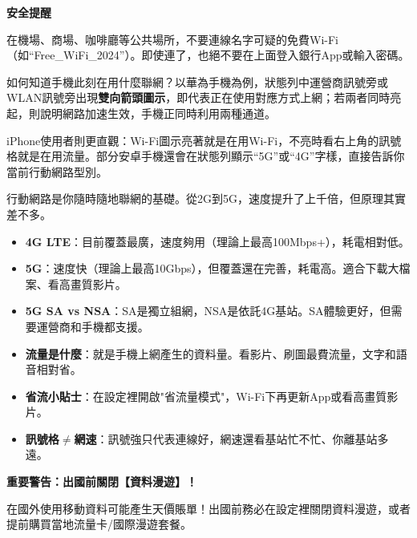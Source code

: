 \textbf{安全提醒}\par

在機場、商場、咖啡廳等公共場所，不要連線名字可疑的免費Wi-Fi（如“Free\_WiFi\_2024”）。即使連了，也絕不要在上面登入銀行App或輸入密碼。


如何知道手機此刻在用什麼聯網？以華為手機為例，狀態列中運營商訊號旁或WLAN訊號旁出現\textbf{雙向箭頭圖示}，即代表正在使用對應方式上網；若兩者同時亮起，則說明網路加速生效，手機正同時利用兩種通道。

iPhone使用者則更直觀：Wi-Fi圖示亮著就是在用Wi-Fi，不亮時看右上角的訊號格就是在用流量。部分安卓手機還會在狀態列顯示“5G”或“4G”字樣，直接告訴你當前行動網路型別。


行動網路是你隨時隨地聯網的基礎。從2G到5G，速度提升了上千倍，但原理其實差不多。


\begin{itemize}
  \item \textbf{4G LTE}：目前覆蓋最廣，速度夠用（理論上最高100Mbps+），耗電相對低。
  \item \textbf{5G}：速度快（理論上最高10Gbps），但覆蓋還在完善，耗電高。適合下載大檔案、看高畫質影片。
  \item \textbf{5G SA vs NSA}：SA是獨立組網，NSA是依託4G基站。SA體驗更好，但需要運營商和手機都支援。
\end{itemize}


\begin{itemize}
  \item \textbf{流量是什麼}：就是手機上網產生的資料量。看影片、刷圖最費流量，文字和語音相對省。
  \item \textbf{省流小貼士}：在設定裡開啟"省流量模式"，Wi-Fi下再更新App或看高畫質影片。
  \item \textbf{訊號格$\neq$網速}：訊號強只代表連線好，網速還看基站忙不忙、你離基站多遠。
\end{itemize}

\textbf{重要警告：出國前關閉【資料漫遊】！}\par

在國外使用移動資料可能產生天價賬單！出國前務必在設定裡關閉資料漫遊，或者提前購買當地流量卡/國際漫遊套餐。


